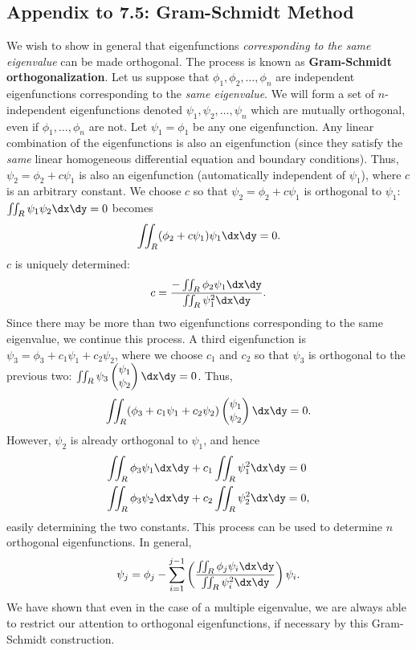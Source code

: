 \subsection*{Appendix to 7.5: Gram-Schmidt Method}

We wish to show in general that eigenfunctions \emph{corresponding to the same eigenvalue} can be made orthogonal.  The process is known as \textbf{Gram-Schmidt orthogonalization}.  Let us suppose that $\phi_1, \phi_2, \ldots, \phi_n$ are independent eigenfunctions corresponding to the \emph{same eigenvalue}.  We will form a set of $n$-independent eigenfunctions denoted $\psi_1, \psi_2, \ldots, \psi_n$ which are mutually orthogonal, even if $\phi_1, \ldots, \phi_n$ are not.  Let $\psi_1 = \phi_1$ be any one eigenfunction.  Any linear combination of the eigenfunctions is also an eigenfunction (since they satisfy the \emph{same} linear homogeneous differential equation and boundary conditions).  Thus, $\psi_2 = \phi_2 + c\psi_1$ is also an eigenfunction (automatically independent of $\psi_1$), where $c$ is an arbitrary constant.  We choose $c$ so that $\psi_2 = \phi_2 + c\psi_1$ is orthogonal to $\psi_1$: $\iint_R\psi_1\psi_2\dx\dy = 0$ becomes
\[
\iint_R (\phi_2 + c\psi_1)\psi_1\dx\dy = 0.
\]
$c$ is uniquely determined:
\begin{equation}
c = \frac{-\iint_R \phi_2\psi_1\dx\dy}{\iint_R \psi_1^2\dx\dy}.
\label{eq:7.5.14}
\end{equation}
Since there may be more than two eigenfunctions corresponding to the same eigenvalue, we continue this process.  A third eigenfunction is $\psi_3 = \phi_3 + c_1\psi_1 + c_2\psi_2$, where we choose $c_1$ and $c_2$ so that $\psi_3$ is orthogonal to the previous two: $\iint_R\psi_3\begin{pmatrix}\psi_1\\\psi_2\end{pmatrix}\dx\dy = 0$.  Thus,
\[
\iint_R (\phi_3 + c_1\psi_1 + c_2\psi_2)\begin{pmatrix}\psi_1\\\psi_2\end{pmatrix}\dx\dy = 0.
\]
However, $\psi_2$ is already orthogonal to $\psi_1$, and hence
\[
\begin{aligned}
\iint_R \phi_3\psi_1\dx\dy + c_1\iint_R \psi_1^2\dx\dy &= 0 \\
\iint_R \phi_3\psi_2\dx\dy + c_2\iint_R \psi_2^2\dx\dy &= 0,
\end{aligned}
\]
easily determining the two constants.  This process can be used to determine $n$ orthogonal eigenfunctions.  In general,
\[
\psi_j = \phi_j - \sum_{i=1}^{j-1}\left(\frac{\iint_R \phi_j\psi_i\dx\dy}{\iint_R \psi_i^2\dx\dy}\right)\psi_i.
\]
We have shown that even in the case of a multiple eigenvalue, we are always able to restrict our attention to orthogonal eigenfunctions, if necessary by this Gram-Schmidt construction.
